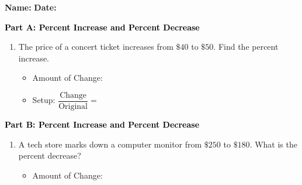\documentclass[12pt, letterpaper, fleqn]{article}
\newcommand{\blank}{\underline{\hspace{2.2cm}}}
\newcommand{\blanklong}{\underline{\hspace{6.5cm}}}
\begin{document}
\textbf{Name:} \underline{\hspace{5cm}}
\hfill
\textbf{Date:} \underline{\hspace{3cm}}\\

\begin{tcolorbox}[colback=customteal!20]
\large\textcolor{black}{\textbf{Part A: Percent Increase and Percent Decrease}}
\end{tcolorbox}

\vspace{3mm}

\begin{enumerate}[itemsep=2.2cm, leftmargin=0.6cm]
\item The price of a concert ticket increases from $\$40$ to $\$50$. Find the percent increase.
\vspace{0.5cm}
\begin{itemize}
\item Amount of Change: \blank
\item Setup: $\dfrac{\text{Change}}{\text{Original}} = $ \blanklong
\end{itemize}
\end{enumerate}

\newpage

\begin{tcolorbox}[colback=customteal!20]
\large\textcolor{black}{\textbf{Part B: Percent Increase and Percent Decrease}}
\end{tcolorbox}

\vspace{3mm}

\begin{enumerate}[itemsep=2.2cm, leftmargin=0.6cm, resume]
\begin{itemize}
\item Answer: \blank \% increase
\end{itemize}
\item A tech store marks down a computer monitor from $\$250$ to $\$180$. What is the percent decrease?
\vspace{0.5cm}
\begin{itemize}
\item Amount of Change: \blank
\end{itemize}
\end{enumerate}
\end{document}

